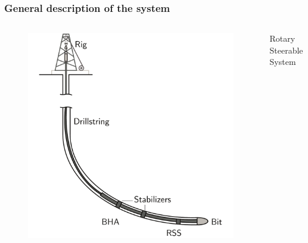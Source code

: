 \documentclass{beamer}
\begin{document}
\begin{frame}\frametitle{General description of the system}
	\begin{columns}
	\hspace{1cm}	\begin{column}{0.6\textwidth}
		\begin{figure}[ht]\centering
				\includegraphics[width=1\textwidth]{images/drillingsystem.pdf}
			\end{figure}
		\end{column}
		\begin{column}{0.4\textwidth}
			\centering
			Rotary Steerable System
			\vspace{-10pt}	
			\begin{figure}[ht]
				\begin{minipage}[t]{1\textwidth}

\end{minipage}
\end{figure}
\end{column}
\end{columns}
\end{frame}
\end{document}

